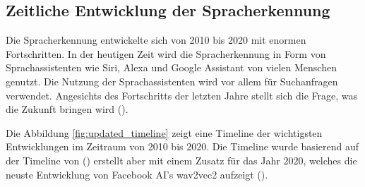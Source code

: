 \documentclass[11pt,a4paper]{article}
\begin{document}
\subsection{Zeitliche Entwicklung der Spracherkennung}
Die Spracherkennung entwickelte sich von 2010 bis 2020 mit enormen Fortschritten. In der heutigen
Zeit wird die Spracherkennung in Form von Sprachassistenten wie Siri, Alexa und Google Assistant von
vielen Menschen genutzt. Die Nutzung der Sprachassistenten wird vor allem für Suchanfragen
verwendet. Angesichts des Fortschritts der letzten Jahre stellt sich die Frage, was die Zukunft
bringen wird (\cite{hannun2021history}).

\noindent \newline
Die Abbildung \ref{fig:updated_timeline} zeigt eine Timeline der wichtigsten Entwicklungen im
Zeitraum von 2010 bis 2020. Die Timeline wurde basierend auf der Timeline von
(\cite{hannun2021history}) erstellt aber mit einem Zusatz für das Jahr 2020, welches die neuste
Entwicklung von Facebook AI's wav2vec2 aufzeigt (\cite{baevski2020wav2vec}).
\end{document}

